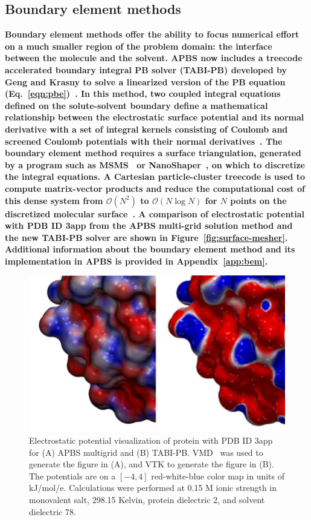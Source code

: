 \documentclass[12pt,titlepage]{article}
\newcommand{\revision}[1]{\color{red} \textbf{#1} \leavevmode\color{black}}
\begin{document}
\subsection{Boundary element methods} \label{sec:bem}
\revision{Boundary element methods offer the ability to focus numerical effort on a much smaller region of the problem domain:  the interface between the molecule and the solvent.
APBS now includes a treecode accelerated boundary integral PB solver (TABI-PB) developed by Geng and Krasny to solve a linearized version of the PB equation (Eq.~\ref{eqn:pbe})~\cite{Geng2013}.
In this method, two coupled integral equations defined on the solute-solvent boundary define a mathematical relationship between the electrostatic surface potential and its normal derivative with a set of integral kernels consisting of Coulomb and screened Coulomb potentials with their normal derivatives~\cite{Juffer1991}.
The boundary element method requires a surface triangulation, generated by a program such as MSMS~\cite{Sanner1995} or NanoShaper~\cite{Decherchi2013}, on which to discretize the integral equations.
A Cartesian particle-cluster treecode is used to compute matrix-vector products and reduce the computational cost of this dense system from $\mathcal{O}(N^2)$ to $\mathcal{O}(N\log N)$ for $N$ points on the discretized molecular surface~\cite{Li2009, Juffer1991}.
A comparison of electrostatic potential with PDB ID 3app from the APBS multi-grid solution method and the new TABI-PB solver are shown in Figure~\ref{fig:surface-mesher}.
Additional information about the boundary element method and its implementation in APBS is provided in Appendix~\ref{app:bem}.}
\begin{figure}
	\centering
	\includegraphics[width=0.80\linewidth]{figs/TABI-MG} 
	\caption{Electrostatic potential visualization of protein with PDB ID 3app for (A) APBS multigrid and (B) TABI-PB. VMD~\cite{Humphrey1996} was used to generate the figure in (A), and VTK to generate the figure in (B). The potentials are on a $[-4, 4]$ red-white-blue color map in units of kJ/mol/e.
		Calculations were performed at 0.15 M ionic strength in monovalent salt, 298.15 Kelvin, protein dielectric 2, and solvent dielectric 78.
	}
	\label{fig:tabi-mg-comparison}
\end{figure}
\end{document}
